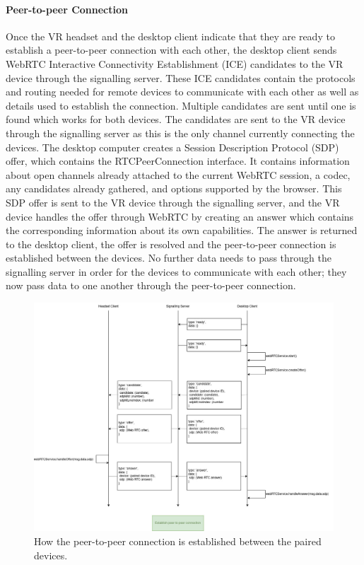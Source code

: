 \paragraph{Peer-to-peer Connection}

Once the VR headset and the desktop client indicate that they are ready to establish a peer-to-peer connection with each other,
the desktop client sends WebRTC Interactive Connectivity Establishment (ICE) candidates to the VR device through the signalling server.
These ICE candidates contain the protocols and routing needed for remote devices to communicate with each other as well as details used to establish the connection.
Multiple candidates are sent until one is found which works for both devices.
The candidates are sent to the VR device through the signalling server as this is the only channel currently connecting the devices.
The desktop computer creates a Session Description Protocol (SDP) offer, which contains the RTCPeerConnection interface. 
It contains information about open channels already attached to the current WebRTC session, a codec, any candidates already gathered, and options supported by the browser.
This SDP offer is sent to the VR device through the signalling server, and the VR device handles the offer through WebRTC by creating an answer which contains the corresponding information about its own capabilities.
The answer is returned to the desktop client, the offer is resolved and the peer-to-peer connection is established between the devices.
No further data needs to pass through the signalling server in order for the devices to communicate with each other; they now pass data to one another through the peer-to-peer connection.

\begin{figure}
    \centering
    \includegraphics[width=0.8\linewidth]{figures/peer-connection(1).jpg}
    \caption{How the peer-to-peer connection is established between the paired devices.}
    \label{fig:peer-connection}
\end{figure}

